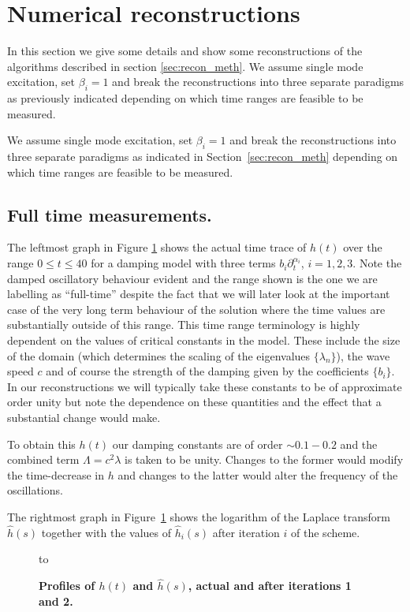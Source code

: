 \section{Numerical reconstructions}\label{sec:reconstructions} %

In this section we give some details and show some reconstructions
of the algorithms described in section \ref{sec:recon_meth}.
We assume single mode excitation, set $\beta_i=1$ and
break the reconstructions into three separate paradigms as previously indicated
depending on which time ranges are feasible to be measured.



We assume single mode excitation, set $\beta_i=1$ and 
break the reconstructions into three separate paradigms as indicated
in Section~\ref{sec:recon_meth} 
depending on which time ranges are feasible to be measured.

\noindent
\subsection{Full time measurements.}

The leftmost graph in Figure \ref{fig:h_and_hath} shows the actual time trace
of $h(t)$ 
over the range $0\leq t\leq 40$
for a damping model with three terms 
$b_i\partial_t^{\alpha_i}$, 
$i=1,2,3$.
Note the damped oscillatory behaviour evident and the range shown
is the one we are labelling as ``full-time'' despite the fact that we
will later look at the important case of 
the very long term
behaviour of the solution where the time values are substantially outside
of this range.  This time range terminology is highly dependent on the
values of critical constants in the model.
These include the size of the domain (which determines the scaling of the
eigenvalues $\{\lambda_n\}$), the wave speed $c$ and of course the strength
of the damping given by the coefficients $\{b_i\}$.
In our reconstructions we will typically take these constants to be of
approximate order unity but note the dependence on these quantities
and the effect that a substantial change would make.

To obtain this $h(t)$ our damping constants are of order 
$\sim 0.1-0.2$ and the combined term 
$\Lambda=c^2\lambda$ 
is taken to be unity.
Changes to the former would modify the time-decrease in $h$ and changes to the 
latter would alter the frequency of the oscillations.

The rightmost graph in Figure~\ref{fig:h_and_hath} shows the logarithm of the
Laplace transform $\hat{h}(s)$ together with the values of $\hat{h}_i(s)$ after
iteration $i$ of the scheme.
\begin{figure}[ht]
\hbox to \hsize{\hfill\copy\figureone\hfill\copy\figuretwo\hfill}
\small
\caption{\small {\bf Profiles of $h(t)$ and $\hat{h}(s)$, actual and after
iterations 1 and 2.}}
\label{fig:h_and_hath}
\end{figure}

